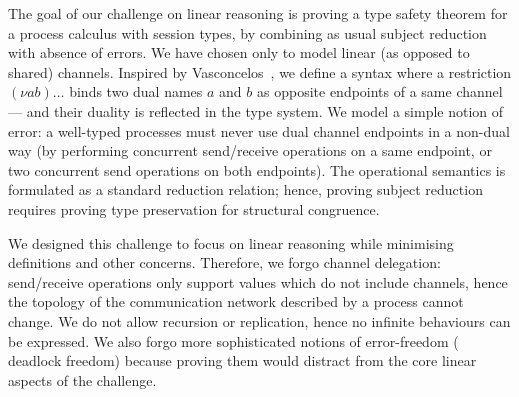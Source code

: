 \documentclass[runningheads]{llncs}
\begin{document}
The goal of our challenge on linear reasoning is proving a type safety theorem
for a process calculus with session types, by combining as usual subject
reduction with absence of errors.  We have chosen  only to model linear (as
opposed to shared) channels. Inspired by Vasconcelos~\cite{Vasconcelos2012}, we
define a syntax where a restriction $(\nu ab)\ldots$ binds two dual names $a$
and $b$ as opposite endpoints of a same channel --- and their duality is
reflected in the type system. We model a simple notion of error: a well-typed
processes must never use dual channel endpoints in a non-dual way (\eg by
performing concurrent send/receive operations on a same endpoint, or two
concurrent send operations on both endpoints).
The operational semantics is formulated as a standard reduction relation; hence,
proving subject reduction requires proving type preservation for structural
congruence.

We designed this challenge to focus on linear reasoning while minimising
definitions and other concerns.  Therefore, we forgo channel delegation:
send/receive operations only support values which do not include channels, hence
the topology of the communication network described by a process cannot change.
We do not allow recursion or replication, hence no infinite behaviours can be
expressed. We also forgo more sophisticated notions of error-freedom (\eg
deadlock freedom) because proving them would distract from the core linear
aspects of the challenge.
\end{document}
